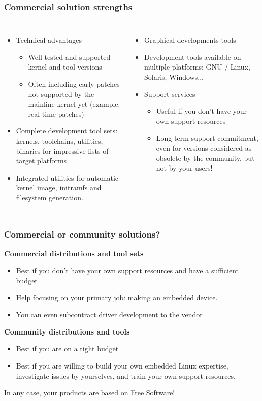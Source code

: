 \begin{frame}
  \frametitle{Commercial solution strengths}
  \begin{columns}
    \begin{itemize}
    \item Technical advantages
      \begin{itemize}
      \item Well tested and supported kernel and tool versions
      \item Often including early patches not supported by the
        mainline kernel yet (example: real-time patches)
      \end{itemize}
    \item Complete development tool sets: kernels, toolchains,
      utilities, binaries for impressive lists of target platforms
    \item Integrated utilities for automatic kernel image, initramfs
      and filesystem generation.
    \end{itemize}
    \begin{itemize}
    \item Graphical developments tools
    \item Development tools available on multiple platforms: GNU /
      Linux, Solaris, Windows...
    \item Support services
      \begin{itemize}
      \item Useful if you don't have your own support resources
      \item Long term support commitment, even for versions considered
        as obsolete by the community, but not by your users!
      \end{itemize}
    \end{itemize}
  \end{columns}
\end{frame}

\begin{frame}
  \frametitle{Commercial or community solutions?}
  {\bf Commercial distributions and tool sets}
  \begin{itemize}
  \item Best if you don't have your own support resources and have a
    sufficient budget
  \item Help focusing on your primary job: making an embedded device.
  \item You can even subcontract driver development to the vendor
  \end{itemize}
  {\bf Community distributions and tools}
  \begin{itemize}
  \item Best if you are on a tight budget
  \item Best if you are willing to build your own embedded Linux
    expertise, investigate issues by yourselves, and train your own
    support resources.
  \end{itemize}
  In any case, your products are based on Free Software!
\end{frame}

